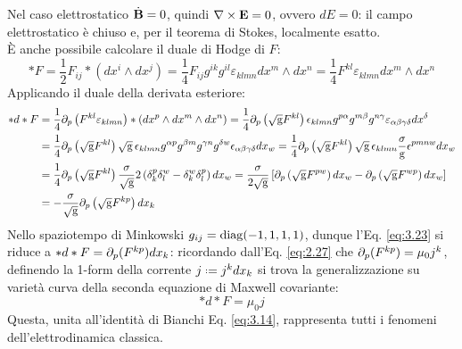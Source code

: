 Nel caso elettrostatico $ \dot{\mathbf{B}} = 0 $, quindi $ \nabla\times\mathbf{E} = 0 $, ovvero $ dE = 0 $: il campo elettrostatico è chiuso e, per il teorema di Stokes, localmente esatto.\\
È anche possibile calcolare il duale di Hodge di $ F $:
\begin{equation}
	*F = \frac{1}{2}F_{ij} * \left( dx^i \wedge dx^j \right) = \frac{1}{4} F_{ij} g^{ik} g^{il} \varepsilon_{klmn} dx^m \wedge dx^n = \frac{1}{4} F^{kl} \varepsilon_{klmn} dx^m \wedge dx^n
	\label{eq:3.22}
\end{equation}
Applicando il duale della derivata esteriore:
\begin{equation}
	\begin{split}
		*d*F &= \frac{1}{4} \partial_p \left( F^{kl} \varepsilon_{klmn} \right) * \left( dx^p \wedge dx^m \wedge dx^n \right) = \frac{1}{4} \partial_p \left( \sqrt{\mathrm{g}} F^{kl} \right) \epsilon_{klmn} g^{p\alpha} g^{m\beta} g^{n\gamma} \varepsilon_{\alpha\beta\gamma\delta} dx^{\delta}\\
		     &= \frac{1}{4} \partial_p \left( \sqrt{\mathrm{g}} F^{kl} \right) \sqrt{\mathrm{g}} \, \epsilon_{klmn} g^{\alpha p} g^{\beta m} g^{\gamma n} g^{\delta w} \epsilon_{\alpha\beta\gamma\delta} dx_w = \frac{1}{4} \partial_p \left( \sqrt{\mathrm{g}} F^{kl} \right) \sqrt{\mathrm{g}}\, \epsilon_{klmn} \frac{\sigma}{\mathrm{g}} \epsilon^{pmnw} dx_w\\
		     &= \frac{1}{4} \partial_p \left( \sqrt{\mathrm{g}} F^{kl} \right) \frac{\sigma}{\sqrt{\mathrm{g}}} 2 \left( \delta^p_k \delta^w_l - \delta^w_k \delta^p_l \right) dx_w = \frac{\sigma}{2\sqrt{\mathrm{g}}} \left[ \partial_p \left( \sqrt{\mathrm{g}} F^{pw} \right) dx_w - \partial_p \left( \sqrt{\mathrm{g}} F^{wp} \right) dx_w \right]\\
		     &= - \frac{\sigma}{\sqrt{\mathrm{g}}} \partial_p \left( \sqrt{\mathrm{g}} F^{kp} \right) dx_k
	\end{split}
	\label{eq:3.23}
\end{equation}
Nello spaziotempo di Minkowski $ g_{ij} = \operatorname{diag}(-1,1,1,1) $, dunque l'Eq. \ref{eq:3.23} si riduce a $ *d*F = \partial_p (F^{kp}) dx_k $: ricordando dall'Eq. \ref{eq:2.27} che $ \partial_p (F^{kp}) = \mu_0 j^k $, definendo la 1-form della corrente $ j \defeq j^k dx_k $ si trova la generalizzazione su varietà curva della seconda equazione di Maxwell covariante:
\begin{equation}
	*d*F = \mu_0 j
	\label{eq:3.24}
\end{equation}
Questa, unita all'identità di Bianchi Eq. \ref{eq:3.14}, rappresenta tutti i fenomeni dell'elettrodinamica classica.










